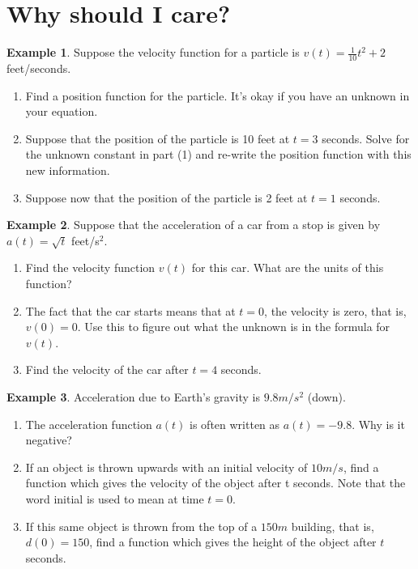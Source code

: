 \documentclass{article}[12pt]
\theoremstyle{definition}
\theoremstyle{example}
\newtheorem{example}{Example}[section]
\theoremstyle{theorem}
\begin{document}
\section{Why should I care?}
\begin{example}
Suppose the velocity function for a particle is $v(t)=\frac{1}{10}t^2+2$ feet/seconds.
\begin{enumerate}
\item Find a position function for the particle. It's okay if you have an unknown in your equation. 
\vspace{2cm}
\item Suppose that the position of the particle is 10 feet at $t=3$ seconds. Solve for the unknown constant in part (1) and re-write the position function with this new information. 
\vspace{2cm}
\item Suppose now that the position of the particle is 2 feet at $t=1$ seconds. 
\vspace{2cm} 
\end{enumerate} 
\end{example}
\begin{example}
Suppose that the acceleration of a car from a stop is given by $a(t)=\sqrt{t}$ feet/s$^2$. 
\begin{enumerate}
\item Find the velocity function $v(t)$ for this car. What are the units of this function?
\vspace{2cm}
\item The fact that the car starts means that at $t=0$, the velocity is zero, that is, $v(0)=0$. Use this to figure out what the unknown is in the formula for $v(t)$. 
\vspace{2cm}
\item Find the velocity of the car after $t=4$ seconds. 
\vspace{1cm}
\end{enumerate}
\end{example}
\begin{example}
Acceleration due to Earth's gravity is $9.8 m/s^2$ (down). 
\begin{enumerate}
\item The acceleration function $a(t)$ is often written as $a(t)=-9.8$. Why is it negative?
\vspace{2cm}
\item If an object is thrown upwards with an initial velocity of $10m/s$, find a function which gives the velocity of the object after t seconds. Note that the word initial is used to mean at time $t = 0$.
\vspace{3cm}
\item If this same object is thrown from the top of a $150m$ building, that is, $d(0) = 150$, find a function which gives the height of the object after $t$
seconds.
\vspace{3cm}
\end{enumerate}
\end{example}
\end{document}
